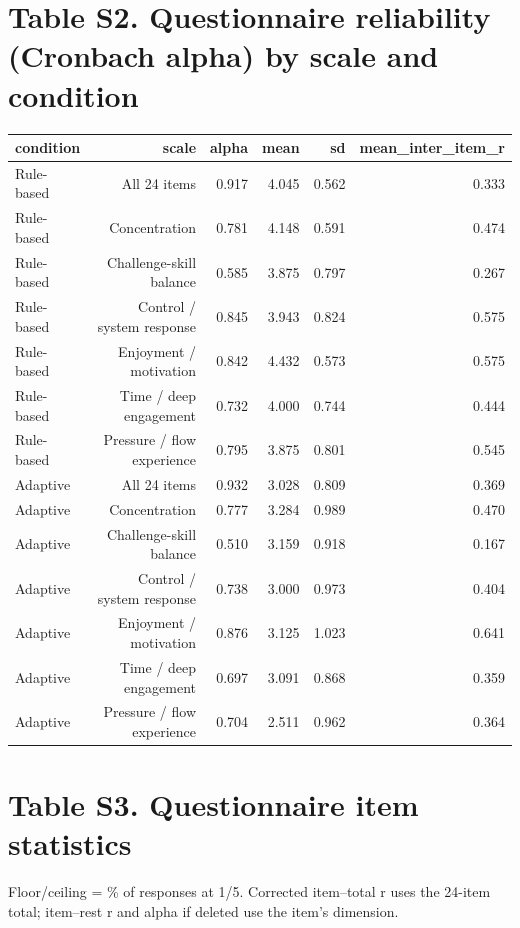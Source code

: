 \documentclass[10pt]{article}
\begin{document}
\section*{Table S2. Questionnaire reliability (Cronbach alpha) by scale and condition}
{\scriptsize\setlength{\tabcolsep}{3pt}\begin{longtable}{lrrrrr}
\toprule
condition & scale & alpha & mean & sd & mean\_inter\_item\_r \\
\midrule
\endhead
Rule-based & All 24 items & 0.917 & 4.045 & 0.562 & 0.333 \\
Rule-based & Concentration & 0.781 & 4.148 & 0.591 & 0.474 \\
Rule-based & Challenge-skill balance & 0.585 & 3.875 & 0.797 & 0.267 \\
Rule-based & Control / system response & 0.845 & 3.943 & 0.824 & 0.575 \\
Rule-based & Enjoyment / motivation & 0.842 & 4.432 & 0.573 & 0.575 \\
Rule-based & Time / deep engagement & 0.732 & 4.000 & 0.744 & 0.444 \\
Rule-based & Pressure / flow experience & 0.795 & 3.875 & 0.801 & 0.545 \\
Adaptive & All 24 items & 0.932 & 3.028 & 0.809 & 0.369 \\
Adaptive & Concentration & 0.777 & 3.284 & 0.989 & 0.470 \\
Adaptive & Challenge-skill balance & 0.510 & 3.159 & 0.918 & 0.167 \\
Adaptive & Control / system response & 0.738 & 3.000 & 0.973 & 0.404 \\
Adaptive & Enjoyment / motivation & 0.876 & 3.125 & 1.023 & 0.641 \\
Adaptive & Time / deep engagement & 0.697 & 3.091 & 0.868 & 0.359 \\
Adaptive & Pressure / flow experience & 0.704 & 2.511 & 0.962 & 0.364 \\
\bottomrule
\end{longtable}}

\section*{Table S3. Questionnaire item statistics}
Floor/ceiling = \% of responses at 1/5. Corrected item--total r uses the 24-item total; item--rest r and alpha if deleted use the item's dimension.
\end{document}
